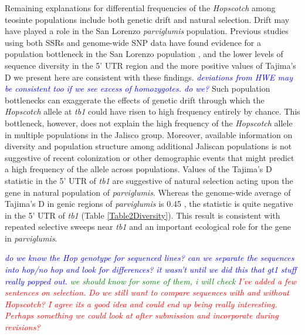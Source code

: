 \documentclass[11pt]{article}
\newcommand{\jri}[1]{\textcolor{blue}{ \emph{\scriptsize  #1}} }
\newcommand{\mbh}[1]{\textcolor{red}{ \emph{\scriptsize  #1}} }
\newcommand{\lev}[1]{\textcolor{green}{\emph{\scriptsize #1}} }
\begin{document}
\begin{linenumbers}
\begin{flushleft}
Remaining explanations for differential frequencies of the \emph{Hopscotch} among teosinte populations include both genetic drift and natural selection.  Drift may have played a role in the San Lorenzo \emph{parviglumis} population. Previous studies using both SSRs and genome-wide SNP data have found evidence for a population bottleneck in the San Lorenzo population \citep{Hufford2010, Pyhajarvi2013}, and the lower levels of sequence diversity in the 5' UTR region and the more positive values of Tajima's D we present here are consistent with these findings. \jri{deviations from HWE may be consistent too if we see excess of homozygotes. do we?} Such population bottlenecks can exaggerate the effects of genetic drift through which the \emph{Hopscotch} allele at \emph{tb1} could have risen to high frequency entirely by chance. This bottleneck, however, does not explain the high frequency of the \emph{Hopscotch} allele in multiple populations in the Jalisco group.  Moreover, available information on diversity and population structure among additional Jaliscan populations \citep{Hufford2010, Pyhajarvi2013} is not suggestive of recent colonization or other demographic events that might predict a high frequency of the allele across populations.  Values of the Tajima's D statistic in the 5' UTR of \emph{tb1} are suggestive of natural selection acting upon the gene in natural population of \emph{parviglumis}.  Whereas the genome-wide average of Tajima's D in genic regions of \emph{parviglumis} is 0.45 \citep{Hufford2012b}, the statistic is quite negative in the 5' UTR of \emph{tb1} (Table \ref{Table2Diversity}). This result is consistent with repeated selective sweeps near \emph{tb1} and an important ecological role for the gene in \emph{parviglumis}.

\jri{do we know the Hop genotype for sequenced lines? can we separate the sequences into hop/no hop and look for differences? it wasn't until we did this that gt1 stuff really popped out.} \lev{we should know for some of them, i will check} \mbh{I've added a few sentences on selection.  Do we still want to compare sequences with and without \emph{Hopscotch}?  I agree its a good idea and could end up being really interesting.  Perhaps something we could look at after submission and incorporate during revisions?}


\end{flushleft}
\end{linenumbers}
\end{document}
